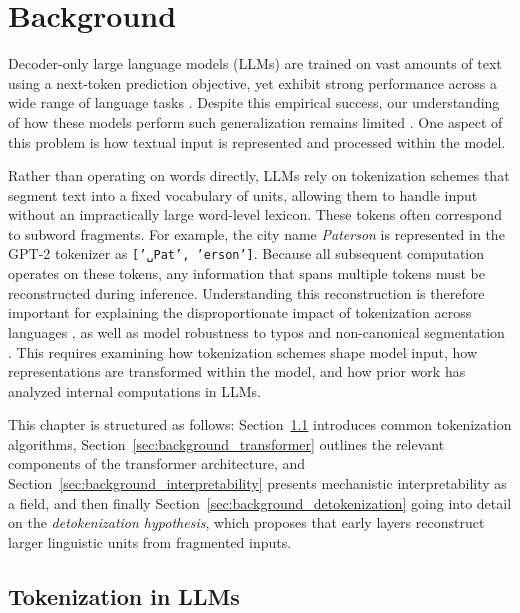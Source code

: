 \chapter{Background} \label{cha:background}
Decoder-only large language models (LLMs) are trained on vast amounts of text using a next-token prediction objective, yet exhibit strong performance across a wide range of language tasks \citep{brown2020}. Despite this empirical success, our understanding of how these models perform such generalization remains limited \citep{sharkey2025}. One aspect of this problem is how textual input is represented and processed within the model.

Rather than operating on words directly, LLMs rely on tokenization schemes that segment text into a fixed vocabulary of units, allowing them to handle input without an impractically large word-level lexicon. These tokens often correspond to subword fragments. For example, the city name \textit{Paterson} is represented in the GPT-2 tokenizer as \texttt{['␣Pat', 'erson']}. Because all subsequent computation operates on these tokens, any information that spans multiple tokens must be reconstructed during inference. Understanding this reconstruction is therefore important for explaining the disproportionate impact of tokenization across languages \citep{petrov2023, ahia2023}, as well as model robustness to typos \citep{zhao2026evaluatingrobustnesslargelanguage, cao2023} and non-canonical segmentation \citep{gutierrez2023, zheng2026}. This requires examining how tokenization schemes shape model input, how representations are transformed within the model, and how prior work has analyzed internal computations in LLMs.

This chapter is structured as follows: Section~\ref{sec:background_tokenization} introduces common tokenization algorithms, Section~\ref{sec:background_transformer} outlines the relevant components of the transformer architecture, and Section~\ref{sec:background_interpretability} presents mechanistic interpretability as a field, and then finally Section~\ref{sec:background_detokenization} going into detail on the \textit{detokenization hypothesis}, which proposes that early layers reconstruct larger linguistic units from fragmented inputs.

\section{Tokenization in LLMs}\label{sec:background_tokenization}

